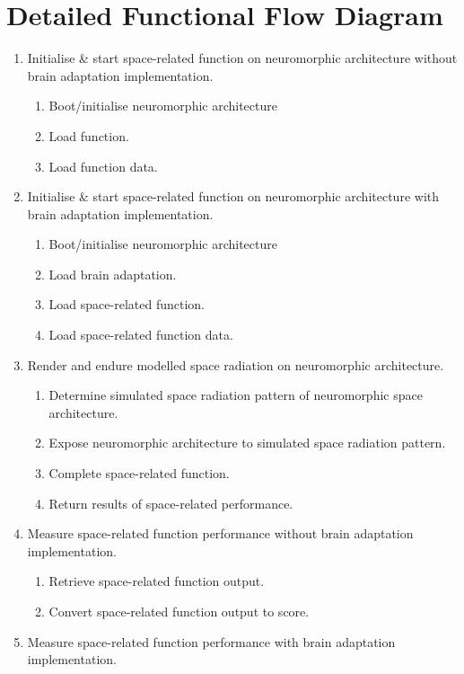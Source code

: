 \section{Detailed Functional Flow Diagram}\label{sec:baseline_detailed_ffd}
\begin{enumerate}
    \item Initialise \& start space-related function on neuromorphic architecture without brain adaptation implementation.    
    \begin{enumerate}
        \item Boot/initialise neuromorphic architecture
        \item Load function.
        \item Load function data.
    \end{enumerate}
    \item Initialise \& start space-related function on neuromorphic architecture with brain adaptation implementation.
    \begin{enumerate}
        \item Boot/initialise neuromorphic architecture
        \item Load brain adaptation.
        \item Load space-related function.
        \item Load space-related function data.
    \end{enumerate}
    \item Render and endure modelled space radiation on neuromorphic architecture.
    \begin{enumerate}
        \item Determine simulated space radiation pattern of neuromorphic space architecture.
        \item Expose neuromorphic architecture to simulated space radiation pattern.
        \item Complete space-related function.
        \item Return results of space-related performance.
    \end{enumerate}
    \item Measure space-related function performance without brain adaptation implementation.
    \begin{enumerate}
        \item Retrieve space-related function output.
        \item Convert space-related function output to score.
    \end{enumerate}
    \item Measure space-related function performance with brain adaptation implementation.

\end{enumerate}
